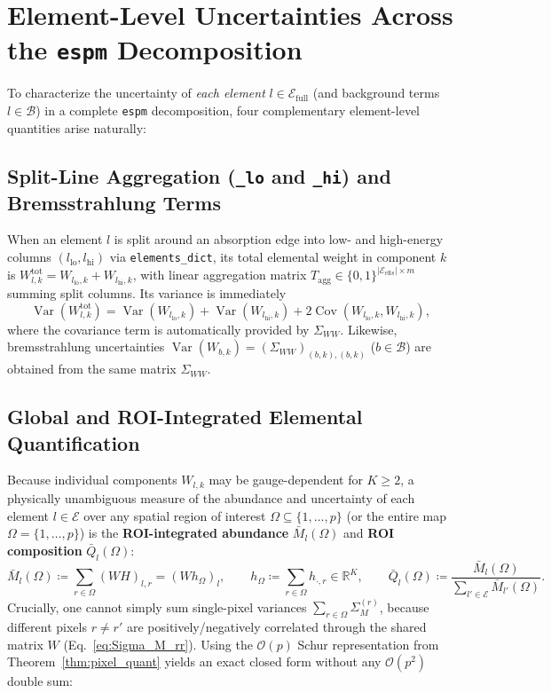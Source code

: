 \documentclass[11pt,a4paper]{article}
\theoremstyle{plain}
\theoremstyle{definition}
\theoremstyle{remark}
\newcommand{\R}{\mathbb{R}}
\newcommand{\E}{\mathcal{E}}
\newcommand{\B}{\mathcal{B}}
\newcommand{\Var}{\operatorname{Var}}
\newcommand{\Cov}{\operatorname{Cov}}
\begin{document}
\section{Element-Level Uncertainties Across the \texttt{espm} Decomposition}

To characterize the uncertainty of \emph{each element} $l \in \E_{\text{full}}$ (and background terms $l \in \B$) in a complete \texttt{espm} decomposition, four complementary element-level quantities arise naturally:

\subsection{Split-Line Aggregation (\texttt{\_lo} and \texttt{\_hi}) and Bremsstrahlung Terms}
When an element $l$ is split around an absorption edge into low- and high-energy columns $(l_{\text{lo}}, l_{\text{hi}})$ via \texttt{elements\_dict}, its total elemental weight in component $k$ is $W_{l,k}^{\text{tot}} = W_{l_{\text{lo}}, k} + W_{l_{\text{hi}}, k}$, with linear aggregation matrix $T_{\text{agg}} \in \{0,1\}^{|\E_{\text{elts}}| \times m}$ summing split columns. Its variance is immediately
\begin{equation}
\Var(W_{l,k}^{\text{tot}}) = \Var(W_{l_{\text{lo}}, k}) + \Var(W_{l_{\text{hi}}, k}) + 2\Cov(W_{l_{\text{lo}}, k}, W_{l_{\text{hi}}, k}),
\end{equation}
where the covariance term is automatically provided by $\Sigma_{WW}$. Likewise, bremsstrahlung uncertainties $\Var(W_{b,k}) = (\Sigma_{WW})_{(b,k),(b,k)}$ ($b \in \B$) are obtained from the same matrix $\Sigma_{WW}$.

\subsection{Global and ROI-Integrated Elemental Quantification}
Because individual components $W_{l,k}$ may be gauge-dependent for $K \ge 2$, a physically unambiguous measure of the abundance and uncertainty of each element $l \in \E$ over any spatial region of interest $\Omega \subseteq \{1,\dots,p\}$ (or the entire map $\Omega = \{1,\dots,p\}$) is the \textbf{ROI-integrated abundance} $\bar{M}_l(\Omega)$ and \textbf{ROI composition} $\bar{Q}_l(\Omega)$:
\begin{equation}
\label{eq:roi_def}
\bar{M}_l(\Omega) \coloneqq \sum_{r \in \Omega} (WH)_{l,r} = (W h_\Omega)_l, \qquad h_\Omega \coloneqq \sum_{r \in \Omega} h_{\cdot, r} \in \R^K, \qquad \bar{Q}_l(\Omega) \coloneqq \frac{\bar{M}_l(\Omega)}{\sum_{l'\in\E} \bar{M}_{l'}(\Omega)}.
\end{equation}
Crucially, one cannot simply sum single-pixel variances $\sum_{r \in \Omega} \Sigma_M^{(r)}$, because different pixels $r \neq r'$ are positively/negatively correlated through the shared matrix $W$ (Eq.~\eqref{eq:Sigma_M_rr}). Using the $\mathcal{O}(p)$ Schur representation from Theorem~\ref{thm:pixel_quant} yields an exact closed form without any $\mathcal{O}(p^2)$ double sum:
\end{document}

